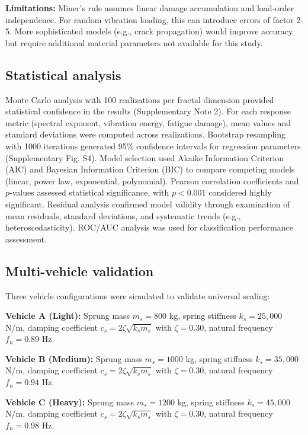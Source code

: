 \documentclass[11pt]{article}
\begin{document}
\textbf{Limitations:} Miner's rule assumes linear damage accumulation and load-order independence. For random vibration loading, this can introduce errors of factor 2-5. More sophisticated models (e.g., crack propagation) would improve accuracy but require additional material parameters not available for this study.

\subsection*{Statistical analysis}

Monte Carlo analysis with 100 realizations per fractal dimension provided statistical confidence in the results (Supplementary Note 2). For each response metric (spectral exponent, vibration energy, fatigue damage), mean values and standard deviations were computed across realizations. Bootstrap resampling with 1000 iterations generated 95\% confidence intervals for regression parameters\cite{Efron1993} (Supplementary Fig. S4). Model selection used Akaike Information Criterion (AIC) and Bayesian Information Criterion (BIC) to compare competing models (linear, power law, exponential, polynomial). Pearson correlation coefficients and $p$-values assessed statistical significance, with $p < 0.001$ considered highly significant. Residual analysis confirmed model validity through examination of mean residuals, standard deviations, and systematic trends (e.g., heteroscedasticity). ROC/AUC analysis\cite{Fawcett2006} was used for classification performance assessment.

\subsection*{Multi-vehicle validation}

Three vehicle configurations were simulated to validate universal scaling:

\textbf{Vehicle A (Light):} Sprung mass $m_s = 800$ kg, spring stiffness $k_s = 25{,}000$ N/m, damping coefficient $c_s = 2\zeta\sqrt{k_s m_s}$ with $\zeta = 0.30$, natural frequency $f_n = 0.89$ Hz.

\textbf{Vehicle B (Medium):} Sprung mass $m_s = 1000$ kg, spring stiffness $k_s = 35{,}000$ N/m, damping coefficient $c_s = 2\zeta\sqrt{k_s m_s}$ with $\zeta = 0.30$, natural frequency $f_n = 0.94$ Hz.

\textbf{Vehicle C (Heavy):} Sprung mass $m_s = 1200$ kg, spring stiffness $k_s = 45{,}000$ N/m, damping coefficient $c_s = 2\zeta\sqrt{k_s m_s}$ with $\zeta = 0.30$, natural frequency $f_n = 0.98$ Hz.
\end{document}
